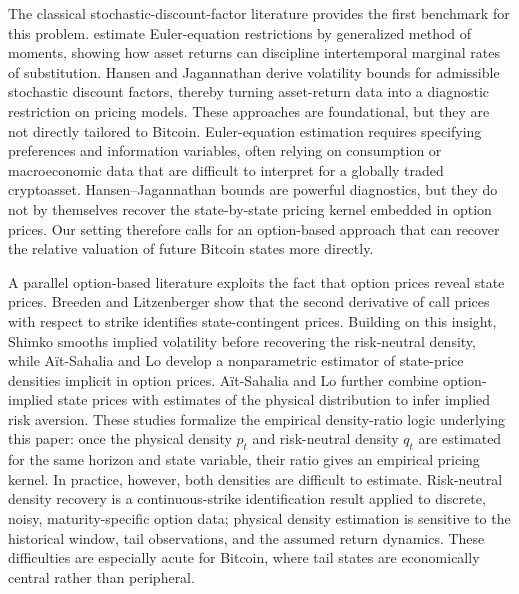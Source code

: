 The classical stochastic-discount-factor literature provides the first benchmark for this problem. \citet{HansenSingleton1982} estimate Euler-equation restrictions by generalized method of moments, showing how asset returns can discipline intertemporal marginal rates of substitution. Hansen and Jagannathan \citep{HansenJagannathan1991} derive volatility bounds for admissible stochastic discount factors, thereby turning asset-return data into a diagnostic restriction on pricing models. These approaches are foundational, but they are not directly tailored to Bitcoin. Euler-equation estimation requires specifying preferences and information variables, often relying on consumption or macroeconomic data that are difficult to interpret for a globally traded cryptoasset. Hansen--Jagannathan bounds are powerful diagnostics, but they do not by themselves recover the state-by-state pricing kernel embedded in option prices. Our setting therefore calls for an option-based approach that can recover the relative valuation of future Bitcoin states more directly.

A parallel option-based literature exploits the fact that option prices reveal state prices. Breeden and Litzenberger \citep{BreedenLitzenberger1978} show that the second derivative of call prices with respect to strike identifies state-contingent prices. Building on this insight, Shimko \citep{Shimko1993} smooths implied volatility before recovering the risk-neutral density, while A{\"i}t-Sahalia and Lo \citep{AitSahaliaLo1998} develop a nonparametric estimator of state-price densities implicit in option prices. A{\"i}t-Sahalia and Lo \citep{AitSahaliaLo2000} further combine option-implied state prices with estimates of the physical distribution to infer implied risk aversion. These studies formalize the empirical density-ratio logic underlying this paper: once the physical density $p_t$ and risk-neutral density $q_t$ are estimated for the same horizon and state variable, their ratio gives an empirical pricing kernel. In practice, however, both densities are difficult to estimate. Risk-neutral density recovery is a continuous-strike identification result applied to discrete, noisy, maturity-specific option data; physical density estimation is sensitive to the historical window, tail observations, and the assumed return dynamics. These difficulties are especially acute for Bitcoin, where tail states are economically central rather than peripheral.

